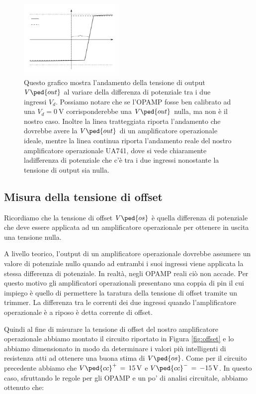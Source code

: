 \begin{figure}
	\includegraphics[width=0.45\textwidth]{../figure/offset_graph.pdf}
    \caption{Questo grafico mostra l'andamento della tensione di output $V\ped{out}$ al variare della differenza di potenziale tra i due ingressi $V_d$. Possiamo notare che se l'OPAMP fosse ben calibrato ad una $V_d=\SI{0}{\volt}$ corrisponderebbe una $V\ped{out}$ nulla, ma non è il nostro caso. Inoltre la linea tratteggiata riporta l'andamento che dovrebbe avere la $V\ped{out}$ di un amplificatore operazionale ideale, mentre la linea continua riporta l'andamento reale del nostro amplificatore operazionale UA741, dove si vede chiaramente ladifferenza di potenziale che c'è tra i due ingressi nonostante la tensione di output sia nulla.}
    \label{fig:plot_Vd}
\end{figure}

\subsection*{Misura della tensione di offset}

Ricordiamo che la tensione di offset $V\ped{os}$ è quella differenza di potenziale che deve essere applicata ad un amplificatore operazionale per ottenere in uscita una tensione nulla.

A livello teorico, l'output di un amplificatore operazionale dovrebbe assumere un valore di potenziale nullo quando ad entrambi i suoi ingressi viene applicata la stessa differenza di potenziale. In realtà, negli OPAMP reali ciò non accade. Per questo motivo gli amplificatori operazionali presentano una coppia di pin il cui impiego è quello di permettere la taratura della tensione di offset tramite un trimmer. La differenza tra le correnti dei due ingressi quando l'amplificatore operazionale è a riposo è detta corrente di offset.

Quindi al fine di misurare la tensione di offset del nostro amplificatore operazionale abbiamo montato il circuito riportato in Figura \ref{fig:offset} e lo abbiamo dimensionato in modo da determinare i valori più intelligenti di resistenza atti ad ottenere una buona stima di $V\ped{os}$.
Come per il circuito precedente abbiamo che $V\ped{cc}^+\,=\,\SI{+15}{\volt}$ e $V\ped{cc}^-\,=\,\SI{-15}{\volt}$.
In questo caso, sfruttando le regole per gli OPAMP e un po' di analisi circuitale, abbiamo ottenuto che:

